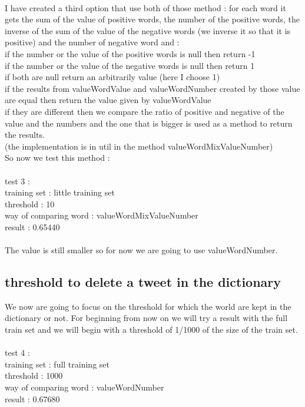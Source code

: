 \documentclass{article}
\begin{document}
 \\
I have created a third option that use both of those method : for each word it gets the sum of the value of positive words, the number of the positive words, the inverse of the sum of the value of the negative words (we inverse it so that it is positive) and the number of negative word and :\\
if the number or the value of the positive words is null then return -1\\
if the number or the value of the negative words is null then return 1\\
if both are null return an arbitrarily value (here I choose 1)\\
if  the results from valueWordValue and valueWordNumber created by those value are equal then return the value given by valueWordValue\\
if they are different then we compare the ratio of positive and negative of the value and the numbers and the one that is bigger is used as a method to return the results.\\
(the implementation is in util in the method valueWordMixValueNumber)\\
So now we test this method :\\
 \\
 test 3 :\\ 
 training set : little training set\\
 threshold : 10\\
 way of comparing word : valueWordMixValueNumber\\
 result :  0.65440\\
 \\

The value is still smaller so for now we are going to use valueWordNumber.



\subsection{threshold to delete a tweet in the dictionary}

We now are going to focus on the threshold for which the world are kept in the dictionary or not. For beginning from now on we will try a result with the full train set and we will begin with a threshold of 1/1000 of the size of the train set.\\
  \\
 test 4 :\\ 
 training set : full training set\\
 threshold : 1000\\
 way of comparing word : valueWordNumber \\
 result :  0.67680\\
 \\
\end{document}
